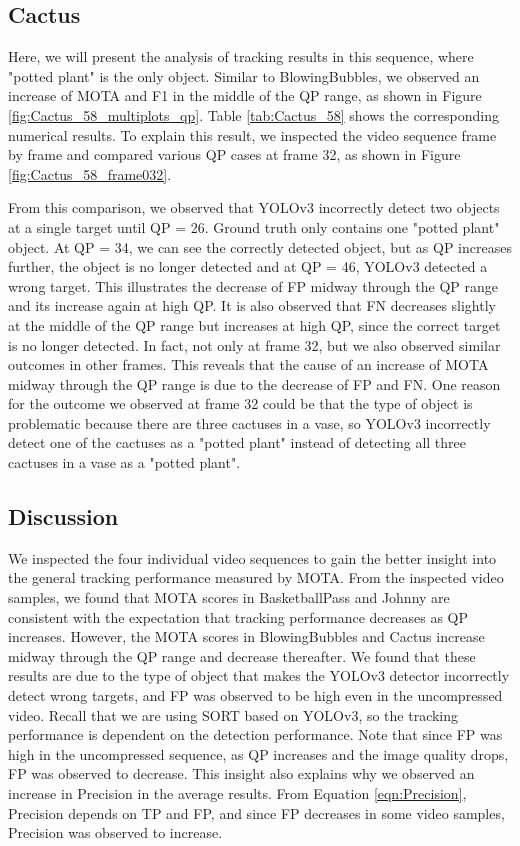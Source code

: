 \subsection{Cactus}
Here, we will present the analysis of tracking results in this sequence, where "potted plant" is the only object. Similar to BlowingBubbles, we observed an increase of MOTA and F1 in the middle of the QP range, as shown in Figure \ref{fig:Cactus_58_multiplots_qp}. Table \ref{tab:Cactus_58} shows the corresponding numerical results. To explain this result, we inspected the video sequence frame by frame and compared various QP cases at frame 32, as shown in Figure \ref{fig:Cactus_58_frame032}.



From this comparison, we observed that YOLOv3 incorrectly detect two objects at a single target until QP = 26. Ground truth only contains one "potted plant" object. At QP = 34, we can see the correctly detected object, but as QP increases further, the object is no longer detected and at QP = 46, YOLOv3 detected a wrong target. This illustrates the decrease of FP midway through the QP range and its increase again at high QP. It is also observed that FN decreases slightly at the middle of the QP range but increases at high QP, since the correct target is no longer detected. In fact, not only at frame 32, but we also observed similar outcomes in other frames. This reveals that the cause of an increase of MOTA midway through the QP range is due to the decrease of FP and FN. One reason for the outcome we observed at frame 32 could be that the type of object is problematic because there are three cactuses in a vase, so YOLOv3 incorrectly detect one of the cactuses as a "potted plant" instead of detecting all three cactuses in a vase as a "potted plant".


\subsection{Discussion}
We inspected the four individual video sequences to gain the better insight into the general tracking performance measured by MOTA. From the inspected video samples, we found that MOTA scores in BasketballPass and Johnny are consistent with the expectation that tracking performance decreases as QP increases. However, the MOTA scores in BlowingBubbles and Cactus increase midway through the QP range and decrease thereafter. We found that these results are due to the type of object that makes the YOLOv3 detector incorrectly detect wrong targets, and FP was observed to be high even in the uncompressed video. Recall that we are using SORT based on YOLOv3, so the tracking performance is dependent on the detection performance. Note that since FP was high in the uncompressed sequence, as QP increases and the image quality drops, FP was observed to decrease. This insight also explains why we observed an increase in Precision in the average results. From Equation \eqref{eqn:Precision}, Precision depends on TP and FP, and since FP decreases in some video samples, Precision was observed to increase.

